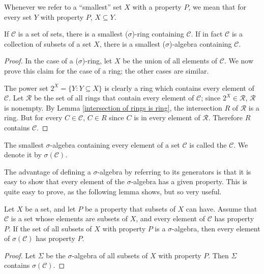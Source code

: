 \begin{subsec}
Whenever we refer to a ``smallest'' set $X$ with a property $P$, we mean that for every set $Y$ with property $P$, $X \subseteq Y$.
\end{subsec}

\begin{lemma}
If $\mathcal C$ is a set of sets, there is a smallest ($\sigma$)-ring containing $\mathcal C$. If in fact $\mathcal C$ is a collection of subsets of a set $X$, there is a smallest ($\sigma$)-algebra containing $\mathcal C$.
\end{lemma}
\begin{proof}
In the case of a ($\sigma$)-ring, let $X$ be the union of all elements of $\mathcal C$.
We now prove this claim for the case of a ring; the other cases are similar.

The power set $2^{X} = \{Y: Y \subseteq X\}$ is clearly a ring which contains every element of $\mathcal C$.
Let $\mathcal R$ be the set of all rings that contain every element of $\mathcal C$; since $2^{X} \in \mathcal R$, $\mathcal R$ is nonempty.
By Lemma \ref{intersection of rings is ring}, the intersection $R$ of $\mathcal R$ is a ring.
But for every $C \in \mathcal C$, $C \in R$ since $C$ is in every element of $\mathcal R$.
Therefore $R$ contains $\mathcal C$.
\end{proof}

\begin{definition}
The smallest $\sigma$-algebra containing every element of a set $\mathcal C$ is called the  $\mathcal C$.
We denote it by $\sigma(\mathcal C)$.
\end{definition}

\begin{subsec}
The advantage of defining a $\sigma$-algebra by referring to its generators is that it is easy to show that every element of the $\sigma$-algebra has a given property.
This is quite easy to prove, as the following lemma shows, but so very useful.
\end{subsec}

\begin{lemma}
\label{generators and relations}
Let $X$ be a set, and let $P$ be a property that subsets of $X$ can have.
Assume that $\mathcal C$ is a set whose elements are subsets of $X$, and every element of $\mathcal C$ has property $P$.
If the set of all subsets of $X$ with property $P$ is a $\sigma$-algebra, then every element of $\sigma(\mathcal C)$ has property $P$.
\end{lemma}
\begin{proof}
Let $\Sigma$ be the $\sigma$-algebra of all subsets of $X$ with property $P$.
Then $\Sigma$ contains $\sigma(\mathcal C)$.
\end{proof}


